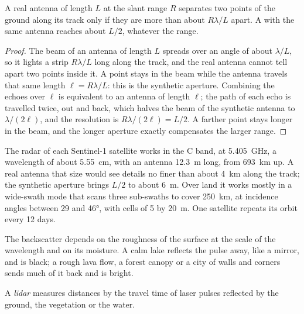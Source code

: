\begin{proposition}\label{prop:b3:remote-sensing-gis:azimuth}
A real antenna of length $L$ at the slant range $R$ separates two points of
the ground along its track only if they are more than about $R\lambda/L$
apart. A  with the same antenna reaches about $L/2$,
whatever the range.
\end{proposition}

\begin{proof}
The beam of an antenna of length $L$ spreads over an angle of about
$\lambda/L$, so it lights a strip $R\lambda/L$ long along the track, and
the real antenna cannot tell apart two points inside it. A point stays in
the beam while the antenna travels that same length $\ell = R\lambda/L$:
this is the synthetic aperture. Combining the echoes over $\ell$ is
equivalent to an antenna of length $\ell$; the path of each echo is
travelled twice, out and back, which halves the beam of the synthetic
antenna to $\lambda/(2\ell)$, and the resolution is $R\lambda/(2\ell) =
L/2$. A farther point stays longer in the beam, and the longer aperture
exactly compensates the larger range.
\end{proof}

The radar of each Sentinel-1 satellite works in the C band, at
\qty{5.405}{GHz}, a wavelength of about \qty{5.55}{cm}, with an antenna
\qty{12.3}{m} long, from \qty{693}{km} up. A real antenna that size would
see details no finer than about \qty{4}{km} along the track; the synthetic
aperture brings $L/2$ to about \qty{6}{m}. Over land it works mostly in a
wide-swath mode that scans three sub-swaths to cover \qty{250}{km}, at
incidence angles between 29 and \ang{46}, with cells of 5 by \qty{20}{m}.
One satellite repeats its orbit every 12 days.

The backscatter depends on the roughness of the surface at the scale of the
wavelength and on its moisture. A calm lake reflects the pulse away, like a
mirror, and is black; a rough lava flow, a forest canopy or a city of walls
and corners sends much of it back and is bright.

\begin{definition}[Lidar]\label{def:b3:remote-sensing-gis:lidar}
A \emph{lidar} measures distances by the travel time of laser
pulses reflected by the ground, the vegetation or the water.
\end{definition}

